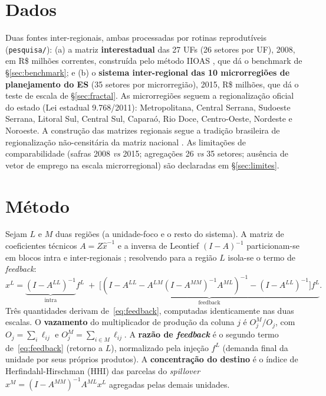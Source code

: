 \documentclass[11pt,a4paper]{article}
\begin{document}
\section{Dados}
\label{sec:dados}
Duas fontes inter-regionais, ambas processadas por rotinas reprodutíveis
(\texttt{pesquisa/}): (a) a matriz \textbf{interestadual} das 27 UFs (26 setores
por UF), 2008, em R\$ milhões correntes, construída pelo método IIOAS
\citep{haddad2017iioas}, que dá o benchmark de \S\ref{sec:benchmark}; e (b) o
\textbf{sistema inter-regional das 10 microrregiões de planejamento do ES} (35
setores por microrregião), 2015, R\$ milhões, que dá o teste de escala de
\S\ref{sec:fractal}. As microrregiões seguem a regionalização oficial do estado
(Lei estadual 9.768/2011): Metropolitana, Central Serrana, Sudoeste Serrana,
Litoral Sul, Central Sul, Caparaó, Rio Doce, Centro-Oeste, Nordeste e Noroeste.
A construção das matrizes regionais segue a tradição brasileira de regionalização
não-censitária da matriz nacional \citep{guilhoto2005estimacao,round1983nonsurvey}.
As limitações de comparabilidade (safras 2008 \emph{vs} 2015; agregações 26
\emph{vs} 35 setores; ausência de vetor de emprego na escala microrregional) são
declaradas em \S\ref{sec:limites}.

\section{Método}
\label{sec:metodo}
Sejam $L$ e $M$ duas regiões (a unidade-foco e o resto do sistema). A matriz de
coeficientes técnicos $A=Z\hat{x}^{-1}$ e a inversa de Leontief
$(I-A)^{-1}$ particionam-se em blocos intra e inter-regionais
\citep{millerblair2009,isard1951}; resolvendo para a região $L$ isola-se o termo
de \emph{feedback}:
\begin{equation}
x^{L}
=\underbrace{(I-A^{LL})^{-1}}_{\text{intra}}f^{L}
\;+\;\underbrace{\big[(I-A^{LL}-A^{LM}(I-A^{MM})^{-1}A^{ML})^{-1}-(I-A^{LL})^{-1}\big]f^{L}}_{\text{feedback}}.
\label{eq:feedback}
\end{equation}
Três quantidades derivam de~\eqref{eq:feedback}, computadas identicamente nas
duas escalas. O \textbf{vazamento} do multiplicador de produção da coluna $j$ é
$O^{M}_j/O_j$, com $O_j=\sum_i \ell_{ij}$ e $O^{M}_j=\sum_{i\in M}\ell_{ij}$. A
\textbf{razão de \emph{feedback}} é o segundo termo de~\eqref{eq:feedback}
(retorno a $L$), normalizado pela injeção $f^{L}$ (demanda final da unidade por
seus próprios produtos). A \textbf{concentração do destino} é o índice de
Herfindahl-Hirschman (HHI) das parcelas do \emph{spillover}
$x^{M}=(I-A^{MM})^{-1}A^{ML}x^{L}$ agregadas pelas demais unidades.
\end{document}
